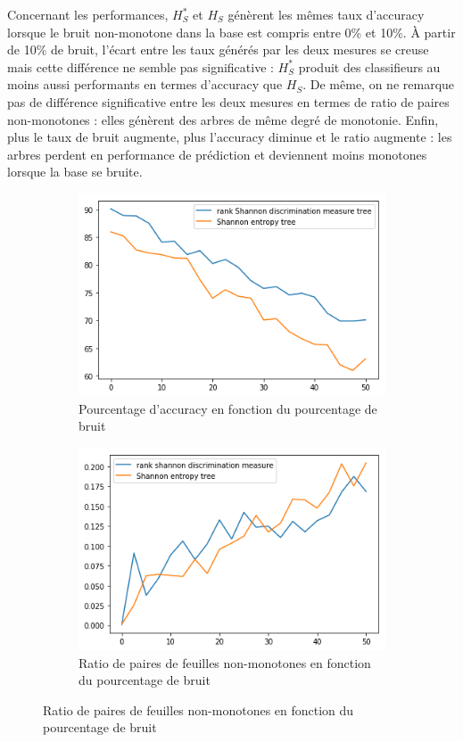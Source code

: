 \documentclass[a4paper]{article}
\begin{document}
Concernant les performances, $H^*_S$ et $H_S$ génèrent les mêmes taux d'accuracy
lorsque le bruit non-monotone dans la base est compris entre 0\% et 10\%. À
partir de 10\% de bruit, l'écart entre les taux générés par les deux mesures se
creuse mais cette différence ne semble pas significative : $H^*_S$ produit des
classifieurs au moins aussi performants en termes d'accuracy que $H_S$. De même,
on ne remarque pas de différence significative entre les deux mesures en termes
de ratio de paires non-monotones : elles génèrent des arbres de même degré de
monotonie. Enfin, plus le taux de bruit augmente, plus l'accuracy diminue et le
ratio augmente : les arbres perdent en performance de prédiction et deviennent
moins monotones lorsque la base se bruite.

\begin{figure}[H]
    \centering
    \begin{subfigure}[c]{0.46\textwidth}
        \centering
        \includegraphics[width=\textwidth]{images/cci_3.png}
        \caption{Pourcentage d'accuracy en fonction du pourcentage de bruit}
    \end{subfigure}
    \begin{subfigure}[c]{0.46\textwidth}
        \centering
        \includegraphics[width=\textwidth]{images/ratio_3.png}
        \caption{Ratio de paires de feuilles non-monotones en fonction du pourcentage de bruit}
    \end{subfigure}


\end{figure}
\end{document}
